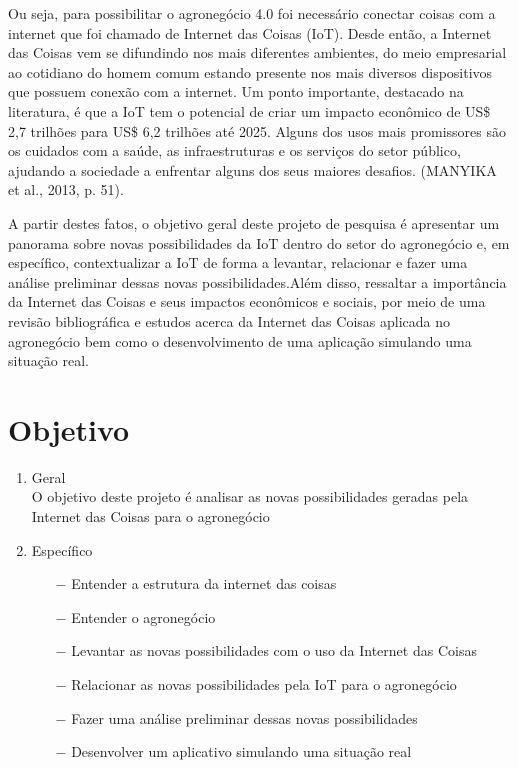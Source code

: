 \documentclass[eso]{bcc}
\begin{document}
Ou seja, para possibilitar o agronegócio 4.0 foi necessário conectar coisas com a internet que 
foi chamado de Internet das Coisas (IoT). Desde então, a Internet das Coisas vem se difundindo 
nos mais diferentes ambientes, do meio empresarial ao cotidiano do homem comum estando presente 
nos mais diversos dispositivos que possuem conexão com a internet. Um ponto importante, 
destacado na literatura, é que a IoT tem o potencial de criar um impacto econômico de 
US\$ 2,7 trilhões para US\$ 6,2 trilhões até 2025. Alguns dos usos mais promissores são os 
cuidados com a saúde, as infraestruturas e os serviços do setor público, ajudando a sociedade 
a enfrentar alguns dos seus maiores desafios. (MANYIKA et al., 2013, p. 51).

A partir destes fatos, o objetivo geral deste projeto de pesquisa é apresentar um panorama 
sobre novas possibilidades da IoT dentro do setor do agronegócio e, em específico, 
contextualizar a IoT de forma a levantar, relacionar e fazer uma análise preliminar dessas 
novas possibilidades.Além disso, ressaltar  a  importância  da Internet das Coisas e seus 
impactos econômicos e sociais,  por meio de uma revisão bibliográfica e estudos acerca da 
Internet das Coisas aplicada no agronegócio bem como o desenvolvimento de uma aplicação 
simulando uma situação real.


\section {Objetivo}

\begin{enumerate}
    \item Geral\\
    O objetivo deste projeto é analisar as novas possibilidades geradas pela Internet das Coisas para o agronegócio
    \item Específico
    \begin{enumerate}
        \item[$-$]  Entender a estrutura da internet das coisas
        \item[$-$] Entender o agronegócio
        \item[$-$] Levantar as novas possibilidades com o uso da Internet das Coisas
        \item[$-$] Relacionar as novas possibilidades pela IoT para o agronegócio 
        \item[$-$] Fazer uma análise preliminar dessas novas possibilidades
        \item[$-$] Desenvolver um aplicativo simulando uma situação real
    \end{enumerate}
\end{enumerate}
\end{document}
